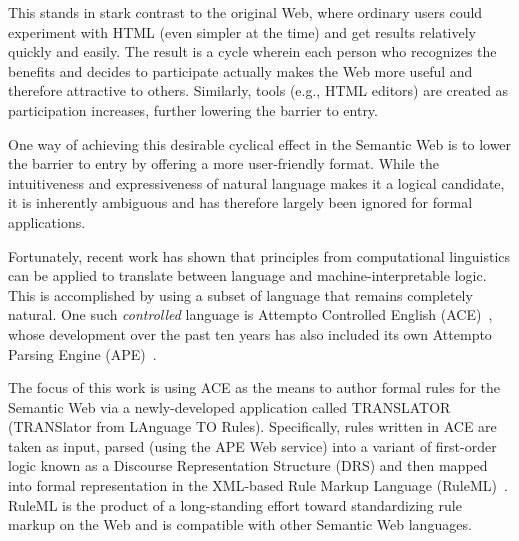 \documentclass[12pt]{report}
\begin{document}
This stands in stark contrast to the original Web, where ordinary users could experiment with HTML (even simpler at the time) and get results relatively quickly and easily. The result is a cycle wherein each person who recognizes the benefits and decides to participate actually makes the Web more useful and therefore attractive to others. Similarly, tools (e.g., HTML editors) are created as participation increases, further lowering the barrier to entry.

One way of achieving this desirable cyclical effect in the Semantic Web is to lower the barrier to entry by offering a more user-friendly format. While the intuitiveness and expressiveness of natural language makes it a logical candidate, it is inherently ambiguous and has therefore largely been ignored for formal applications.

Fortunately, recent work has shown that principles from computational linguistics can be applied to translate between language and machine-interpretable logic. This is accomplished by using a subset of language that remains completely natural. One such \textit{controlled} language is Attempto Controlled English (ACE)~\cite{ace}, whose development over the past ten years has also included its own Attempto Parsing Engine (APE)~\cite{ape}.

The focus of this work is using ACE as the means to author formal rules for the Semantic Web via a newly-developed application called TRANSLATOR (TRANSlator from LAnguage TO Rules). Specifically, rules written in ACE are taken as input, parsed (using the APE Web service) into a variant of first-order logic known as a Discourse Representation Structure (DRS) and then mapped into formal representation in the XML-based Rule Markup Language (RuleML)~\cite{boley}. RuleML is the product of a long-standing effort toward standardizing rule markup on the Web and is compatible with other Semantic Web languages.
\end{document}
